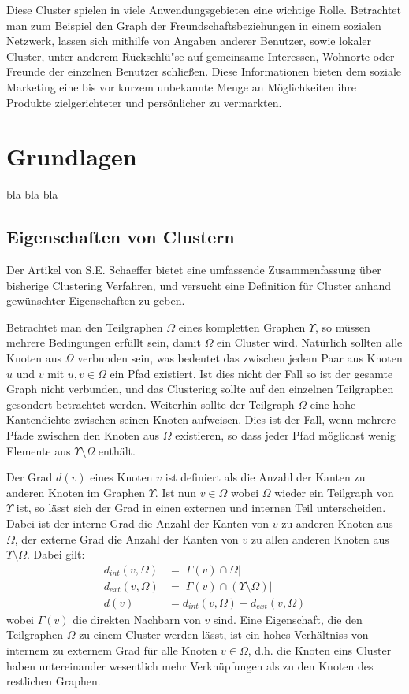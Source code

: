 \documentclass[journal]{vgtc}
\begin{document}
  Diese Cluster spielen in viele Anwendungsgebieten eine wichtige Rolle. 
  Betrachtet man zum Beispiel den Graph der Freundschaftsbeziehungen in einem sozialen Netzwerk,
  lassen sich mithilfe von Angaben anderer Benutzer, sowie lokaler Cluster, unter anderem Rückschlü"se 
  auf gemeinsame Interessen, Wohnorte oder Freunde der einzelnen Benutzer schließen.
  Diese Informationen bieten dem soziale Marketing eine bis vor kurzem unbekannte Menge
  an Möglichkeiten ihre Produkte zielgerichteter und persönlicher zu vermarkten.

\section{Grundlagen}
  
  bla bla bla
  
  \subsection{Eigenschaften von Clustern}
  \label{sec:properties} 
  Der Artikel von S.E. Schaeffer \cite{Schaeffer} bietet eine umfassende Zusammenfassung
  über bisherige Clustering Verfahren, und versucht eine Definition für 
  Cluster anhand gewünschter Eigenschaften zu geben.
  
  Betrachtet man den Teilgraphen $\Omega$ eines kompletten Graphen $\Upsilon$, so müssen
  mehrere Bedingungen erfüllt sein, damit $\Omega$ ein Cluster wird.
  Natürlich sollten alle Knoten aus $\Omega$ verbunden sein, was bedeutet das 
  zwischen jedem Paar aus Knoten $u$ und $v$ mit $u,v \in \Omega$ ein Pfad existiert. 
  Ist dies nicht der Fall so ist der gesamte Graph nicht verbunden, und das 
  Clustering sollte auf den einzelnen Teilgraphen gesondert betrachtet werden.
  Weiterhin sollte der Teilgraph $\Omega$ eine hohe Kantendichte zwischen seinen Knoten
  aufweisen. Dies ist der Fall, wenn mehrere Pfade zwischen den Knoten aus $\Omega$ existieren,
  so dass jeder Pfad möglichst wenig Elemente aus $\Upsilon \setminus \Omega$ enthält.
  
  Der Grad $d(v)$ eines Knoten $v$ ist definiert als die Anzahl der Kanten zu anderen Knoten im
  Graphen $\Upsilon$. Ist nun $v \in \Omega$ wobei $\Omega$ wieder ein Teilgraph von $\Upsilon$
  ist, so lässt sich der Grad in einen externen und internen Teil unterscheiden. Dabei
  ist der interne Grad die Anzahl der Kanten von $v$ zu anderen Knoten aus $\Omega$, der externe
  Grad die Anzahl der Kanten von $v$ zu allen anderen Knoten aus $\Upsilon \setminus \Omega$.
  Dabei gilt:
    \begin{align}
      d_{int}(v, \Omega) &= |\Gamma(v) \cap \Omega |\\
      d_{ext}(v, \Omega) &= |\Gamma(v) \cap (\Upsilon \setminus \Omega) | \\
      d(v) &= d_{int}(v, \Omega) + d_{ext}(v, \Omega)
    \end{align}
  wobei $\Gamma(v)$ die direkten Nachbarn von $v$ sind.
  Eine Eigenschaft, die den Teilgraphen $\Omega$ zu einem Cluster werden lässt, ist ein hohes
  Verhältniss von internem zu externem Grad für alle Knoten $v \in \Omega$, d.h. die Knoten eins 
  Cluster haben untereinander wesentlich mehr Verknüpfungen als zu den Knoten des restlichen Graphen.
   
\end{document}
